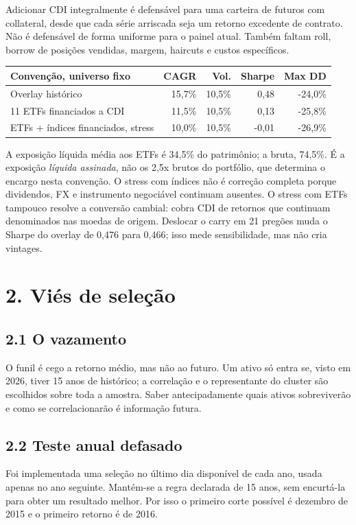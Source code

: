\documentclass[10pt,a4paper]{article}
\begin{document}
Adicionar CDI integralmente é defensável para uma carteira de futuros com
collateral, desde que cada série arriscada seja um retorno excedente de contrato.
Não é defensável de forma uniforme para o painel atual. Também faltam roll,
borrow de posições vendidas, margem, haircuts e custos específicos.

\begin{tabularx}{\textwidth}{Xrrrr}
\toprule
Convenção, universo fixo & CAGR & Vol. & Sharpe & Max DD\\
\midrule
Overlay histórico & 15,7\% & 10,5\% & 0,48 & -24,0\%\\
11 ETFs financiados a CDI & 11,5\% & 10,5\% & 0,13 & -25,8\%\\
ETFs + índices financiados, stress & 10,0\% & 10,5\% & -0,01 & -26,9\%\\
\bottomrule
\end{tabularx}

A exposição líquida média aos ETFs é 34,5\% do patrimônio; a bruta, 74,5\%.
É a exposição \textit{líquida assinada}, não os 2,5x brutos do portfólio, que
determina o encargo nesta convenção. O stress com índices não é correção
completa porque dividendos, FX e instrumento negociável continuam ausentes.
O stress com ETFs tampouco resolve a conversão cambial: cobra CDI de retornos
que continuam denominados nas moedas de origem.
Deslocar o carry em 21 pregões muda o Sharpe do overlay de 0,476 para 0,466;
isso mede sensibilidade, mas não cria vintages.

\newpage
\section*{2. Viés de seleção}

\subsection*{2.1 O vazamento}
O funil é cego a retorno médio, mas não ao futuro. Um ativo só entra se, visto em
2026, tiver 15 anos de histórico; a correlação e o representante do cluster são
escolhidos sobre toda a amostra. Saber antecipadamente quais ativos sobreviverão
e como se correlacionarão é informação futura.

\subsection*{2.2 Teste anual defasado}
Foi implementada uma seleção no último dia disponível de cada ano, usada apenas
no ano seguinte. Mantém-se a regra declarada de 15 anos, sem encurtá-la para
obter um resultado melhor. Por isso o primeiro corte possível é dezembro de
2015 e o primeiro retorno é de 2016.
\end{document}
